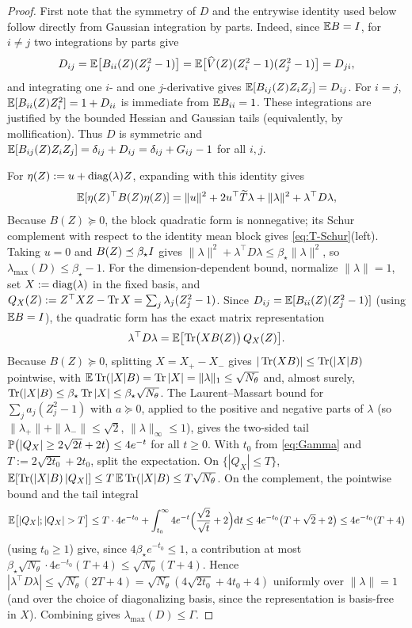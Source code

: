 \begin{proof}
First note that the symmetry of $D$ and the entrywise identity used below follow directly from
Gaussian integration by parts. Indeed, since $\mathbb{E} B=I$, for $i\neq j$ two integrations by parts give
\[
    D_{ij}=\mathbb{E}\bigl[B_{ii}(Z)(Z_j^2-1)\bigr]
    =\mathbb{E}\bigl[\widehat V(Z)(Z_i^2-1)(Z_j^2-1)\bigr]=D_{ji},
\]
and integrating one $i$- and one $j$-derivative gives
$\mathbb{E}[B_{ij}(Z)Z_iZ_j]=D_{ij}$. For $i=j$,
$\mathbb{E}[B_{ii}(Z)Z_i^2]=1+D_{ii}$ is immediate from $\mathbb{E} B_{ii}=1$. These integrations are justified by
the bounded Hessian and Gaussian tails (equivalently, by mollification). Thus $D$ is symmetric and
$\mathbb{E}[B_{ij}(Z)Z_iZ_j]=\delta_{ij}+D_{ij}=\delta_{ij}+G_{ij}-1$ for all $i,j$.

For $\eta(Z):=u+\operatorname{diag}(\lambda)Z$, expanding with this identity gives
\begin{equation}
\label{eq:eta-B-identity}
    \mathbb{E}[\eta(Z)^\top B(Z)\eta(Z)]=\|u\|^2+2u^\top\widetilde T\lambda+\|\lambda\|^2+\lambda^\top D\lambda,
\end{equation}
Because $B(Z)\succeq0$, the block quadratic form is nonnegative; its Schur complement with respect to
the identity mean block gives
\eqref{eq:T-Schur}(left). Taking $u=0$ and $B(Z)\preceq\beta_\star I$ gives
$\|\lambda\|^2+\lambda^\top D\lambda\leq\beta_\star\|\lambda\|^2$, so
$\lambda_{\max}(D)\leq\beta_\star-1$. For the dimension-dependent bound, normalize $\|\lambda\|=1$,
set $X:=\operatorname{diag}(\lambda)$ in the fixed basis, and
$Q_X(Z):=Z^\top XZ-\operatorname{Tr} X=\sum_j\lambda_j(Z_j^2-1)$. Since
$D_{ij}=\mathbb{E}[B_{ii}(Z)(Z_j^2-1)]$ (using $\mathbb{E} B=I$), the quadratic form has the exact matrix
representation
\[
    \lambda^\top D\lambda=\mathbb{E}\bigl[\operatorname{Tr}\bigl(XB(Z)\bigr)\,Q_X(Z)\bigr].
\]
Because $B(Z)\succeq0$, splitting $X=X_+-X_-$ gives $|\operatorname{Tr}(XB)|\leq\operatorname{Tr}(|X|B)$ pointwise, with
$\mathbb{E}\operatorname{Tr}(|X|B)=\operatorname{Tr}|X|=\|\lambda\|_1\leq\sqrt{N_\theta}$ and, almost surely,
$\operatorname{Tr}(|X|B)\leq\beta_\star\operatorname{Tr}|X|\leq\beta_\star\sqrt{N_\theta}$. The Laurent--Massart bound
\citep{laurent2000adaptive} for $\sum_ja_j(Z_j^2-1)$ with $a\succeq0$, applied to the positive and
negative parts of $\lambda$ (so $\|\lambda_+\|+\|\lambda_-\|\leq\sqrt2$, $\|\lambda\|_\infty\leq1$),
gives the two-sided tail
$\mathbb{P}\bigl(|Q_X|\geq2\sqrt{2t}+2t\bigr)\leq4e^{-t}$ for all $t\geq0$. With $t_0$ from
\eqref{eq:Gamma} and $T:=2\sqrt{2t_0}+2t_0$, split the expectation. On $\{|Q_X|\leq T\}$,
$\mathbb{E}[\operatorname{Tr}(|X|B)\,|Q_X|]\leq T\,\mathbb{E}\operatorname{Tr}(|X|B)\leq T\sqrt{N_\theta}$. On the complement, the pointwise
bound and the tail integral
\[
    \E\bigl[|Q_X|;|Q_X|>T\bigr]
    \leq T\cdot4e^{-t_0}+\int_{t_0}^\infty4e^{-t}\Bigl(\frac{\sqrt2}{\sqrt t}+2\Bigr)\dd t
    \leq4e^{-t_0}\bigl(T+\sqrt2+2\bigr)\leq4e^{-t_0}(T+4)
\]
(using $t_0\geq1$) give, since $4\beta_\star e^{-t_0}\leq1$, a contribution at most
$\beta_\star\sqrt{N_\theta}\cdot4e^{-t_0}(T+4)\leq\sqrt{N_\theta}(T+4)$. Hence
$|\lambda^\top D\lambda|\leq\sqrt{N_\theta}(2T+4)=\sqrt{N_\theta}(4\sqrt{2t_0}+4t_0+4)$ uniformly over
$\|\lambda\|=1$ (and over the choice of diagonalizing basis, since the representation is basis-free
in $X$). Combining gives $\lambda_{\max}(D)\leq\Gamma$.
\end{proof}

